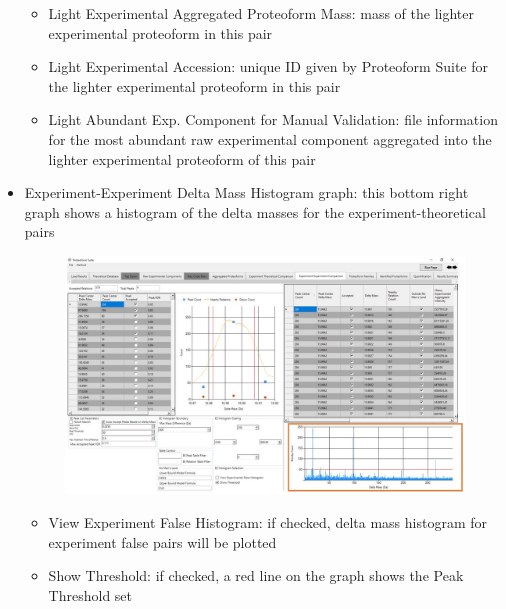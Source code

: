 \begin{itemize}
\begin{itemize}
	\item Light Experimental Aggregated Proteoform Mass: mass of the lighter experimental proteoform in this pair
	\item Light Experimental Accession: unique ID given by Proteoform Suite for the lighter experimental proteoform in this pair		
	\item Light Abundant Exp. Component for Manual Validation: file information for the most abundant raw experimental component aggregated into the lighter experimental proteoform of this pair
\end{itemize}
\item Experiment-Experiment Delta Mass Histogram graph: this bottom right graph shows a histogram of the delta masses for the experiment-theoretical pairs
\begin{figure}[h]
\centering
\includegraphics[scale=0.46]{figures/ee5.jpg}
\end{figure}
\begin{itemize} 
	\item View Experiment False Histogram: if checked, delta mass histogram for experiment false pairs will be plotted
	\item Show Threshold: if checked, a red line on the graph shows the Peak Threshold set
	\end{itemize}
\end{itemize}